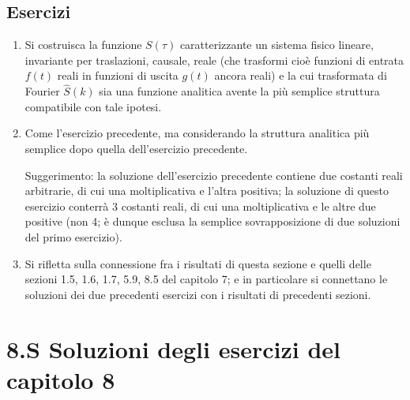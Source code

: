 \documentclass[11pt, a4paper]{book}
\numberwithin{equation}{section}
\newenvironment{esercizi}{\subsection*{Esercizi}\begin{enumerate}}{\end{enumerate}}
\begin{document}
\begin{esercizi}
\item Si costruisca la funzione $S(\tau)$ caratterizzante un sistema fisico lineare, invariante per traslazioni, causale, reale (che trasformi cioè funzioni di entrata $f(t)$ reali in funzioni di uscita $g(t)$ ancora reali) e la cui trasformata di Fourier $\hat{S}(k)$ sia una funzione analitica avente la più semplice struttura compatibile con tale ipotesi.

\item Come l'esercizio precedente, ma considerando la struttura analitica più semplice dopo quella dell'esercizio precedente.

Suggerimento: la soluzione dell'esercizio precedente contiene due costanti reali arbitrarie, di cui una moltiplicativa e l'altra positiva; la soluzione di questo esercizio conterrà 3 costanti reali, di cui una moltiplicativa e le altre due positive (non 4; è dunque esclusa la semplice sovrapposizione di due soluzioni del primo esercizio).

\item Si rifletta sulla connessione fra i risultati di questa sezione e quelli delle sezioni 1.5, 1.6, 1.7, 5.9, 8.5 %
del capitolo 7; e in particolare si connettano le soluzioni dei due precedenti esercizi con i risultati di precedenti sezioni.
\end{esercizi}

\section*{8.S \quad Soluzioni degli esercizi del capitolo 8}
\end{document}
